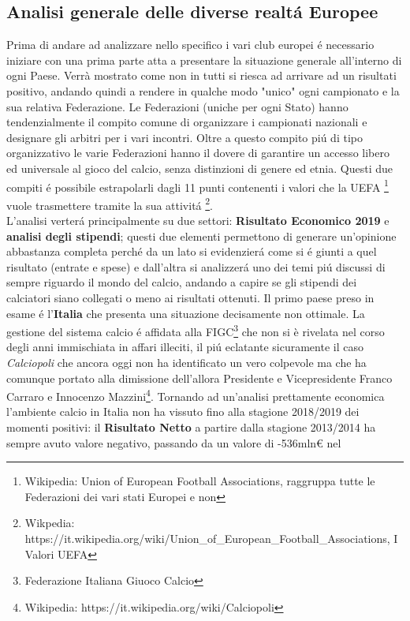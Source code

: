 \documentclass[
    corpo=12pt,
    oneside,
    evenboxes,
    tipotesi=triennale,
    stile=classica,
    oldstyle,
    autoretitolo,
    greek,
]{toptesi}
\begin{document}
\begin{interlinea}{1.5}
\section{Analisi generale delle diverse realt\'a Europee}
Prima di andare ad analizzare nello specifico i vari club europei \'e necessario iniziare con una prima 
parte atta a presentare la situazione generale all'interno di ogni Paese. Verrà mostrato come non in tutti 
si riesca ad arrivare ad un risultati positivo, andando quindi a rendere in qualche modo 
"unico" ogni campionato e la sua relativa Federazione. Le Federazioni (uniche per ogni Stato) hanno tendenzialmente il compito
comune di organizzare i campionati nazionali e designare gli arbitri per i vari incontri. Oltre a questo compito pi\'u di tipo
organizzativo le varie Federazioni hanno il dovere di garantire un accesso libero ed universale al gioco del calcio, senza distinzioni
di genere ed etnia. Questi due compiti \'e possibile estrapolarli dagli 11 punti contenenti i valori che la UEFA 
\footnote{Wikipedia: Union of European Football Associations, raggruppa tutte le Federazioni dei vari stati Europei e non} vuole
trasmettere tramite la sua attivit\'a \footnote{Wikpedia: https://it.wikipedia.org/wiki/Union\_of\_European\_Football\_Associations, I Valori UEFA}.\\
L'analisi verter\'a principalmente su due settori: \textbf{Risultato Economico 2019} e \textbf{analisi degli stipendi}; questi due elementi
permettono di generare un'opinione abbastanza completa perch\'e da un lato si evidenzier\'a come si \'e giunti a quel risultato (entrate e spese)
e dall'altra si analizzer\'a uno dei temi pi\'u discussi di sempre riguardo il mondo del calcio, andando a capire se gli stipendi dei calciatori
siano collegati o meno ai risultati ottenuti.\newline
Il primo paese preso in esame \'e l'\textbf{Italia} che presenta una situazione decisamente non ottimale. La gestione del sistema calcio 
\'e affidata alla FIGC\footnote{Federazione Italiana Giuoco Calcio} che non si è rivelata nel corso degli anni immischiata in affari illeciti,
il pi\'u eclatante sicuramente il caso \emph{Calciopoli} che ancora oggi non ha identificato un vero colpevole ma che ha comunque portato
alla dimissione dell'allora Presidente e Vicepresidente Franco Carraro e Innocenzo Mazzini\footnote{Wikipedia: https://it.wikipedia.org/wiki/Calciopoli}.
Tornando ad un'analisi prettamente economica l'ambiente calcio in Italia non ha vissuto fino alla stagione 2018/2019 dei momenti positivi:
il \textbf{Risultato Netto} a partire dalla stagione 2013/2014 ha sempre avuto valore negativo, passando da un valore di -536mln€ nel

\end{interlinea}
\end{document}
